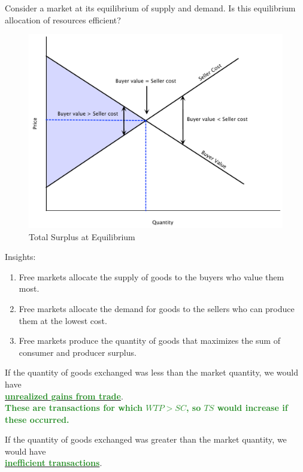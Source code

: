 \documentclass[11pt]{article}\usepackage[]{graphicx}\usepackage[]{color}
\theoremstyle{definition}
\newcommand{\ddp}[1]{{\textbf{\textcolor{ForestGreen}{#1}}}}
\newcommand{\dd}[1]{{\underline{\textbf{\textcolor{ForestGreen}{#1}}}}}
\begin{document}
	
	Consider a market at its equilibrium of supply and demand. Is this equilibrium allocation of resources efficient? 
	
	\begin{figure}[H]
		\centering
		\includegraphics[scale=.35]{plot21.pdf}
		\caption{Total Surplus at Equilibrium}
	\end{figure}
	
	
	
	Insights: 
	\begin{enumerate}
		\item Free markets allocate the supply of goods to the buyers who value them most.
		\item Free markets allocate the demand for goods to the sellers who can produce them at the lowest cost.
		\item Free markets produce the quantity of goods that maximizes the sum of consumer and producer surplus.
	\end{enumerate}
	
	
	If the quantity of goods exchanged was less than the market quantity, we would have \\
	\dd{unrealized gains from trade}.
	\\
	
	\ddp{These are transactions for which $WTP>SC$, so $TS$ would increase if these occurred.\\}

	
	If the quantity of goods exchanged was greater than the market quantity, we would have \\	
	\dd{inefficient transactions}.
	\\
	
\end{document}
